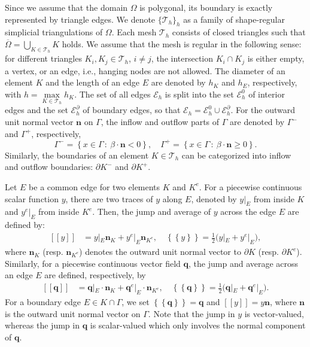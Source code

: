 \documentclass[a4paper,10pt]{article}
\newcommand{\set}[2]{\left\{{#1}\,:~{#2}\right\}}
\newcommand {\average}[1] {\mbox{$\left\{\!\!\left\{ #1 \right\}\!\!\right\}$}}
\newcommand {\jump}[1] {\mbox{$\left[\!\left[ #1 \right]\!\right]$}}
\newcommand{\cT}{{\mathcal{T}}}
\newcommand{\cE}{{\mathcal{E}}}
\newcommand{\bn}{{\mathbf{n}}}
\numberwithin{theorem}{section}
\begin{document}
Since we assume that the domain $\Omega$ is polygonal, its boundary is exactly represented by triangle edges. We denote $\{ \cT_h\}_h$ as a family of shape-regular simplicial triangulations of $\Omega$. Each mesh $\cT_h$ consists of closed triangles such that $\overline{\Omega} = \bigcup_{K \in \cT_h} K$ holds. We assume that the mesh is regular in the following sense: for different triangles
$K_i, K_j \in \cT_h$, $i \not= j$, the intersection  $K_i \cap K_j$ is either empty, a vertex, or an edge, i.e., hanging nodes are not allowed. The diameter of an element $K$ and the length of an edge $E$ are denoted by $h_{K}$ and $h_E$, respectively, with $h = \max \limits_{K \in \cT_h}  h_K$.
The  set of all edges $\cE_h$ is split into the set $\cE^0_h$ of interior edges and the set $\cE^{\partial}_h$ of boundary edges, so that $\cE_h=\cE^{0}_h  \cup \cE^{\partial}_h$. For the outward unit normal  vector  $\bn$ on $\Gamma$, the inflow and outflow parts of $\Gamma$ are denoted by $\Gamma^-$ and $\Gamma^+$, respectively,
\[
          \Gamma^- = \set{x \in \Gamma}{\beta\cdot \bn < 0}, \quad
          \Gamma^+ = \set{x \in \Gamma}{\beta \cdot \bn \geq 0}.
\]
Similarly, the boundaries of an element $K \in \cT_h$ can be categorized into inflow and outflow boundaries: $\partial K^-$ and $\partial K^+$. 

Let $E$ be a common edge for two elements $K$ and $K^e$. For a piecewise continuous scalar function $y$, there are two traces of $y$ along $E$, denoted by $y|_E$ from inside $K$ and $y^e|_E$ from inside $K^e$. Then, the jump and average of $y$ across the edge $E$ are defined by:
\begin{align*}
    \jump{y}&=y|_E\bn_{K}+y^e|_E\bn_{K^e}, \quad
    \average{y}=\frac{1}{2}\big( y|_E+y^e|_E \big),
\end{align*}
where $\bn_K$ (resp. $\bn_{K^e}$) denotes the outward unit  normal vector to $\partial K$ (resp. $\partial K^e$). Similarly, for a piecewise continuous vector field $\mathbf{q}$, the jump and average across an edge $E$ are defined, respectively, by
\begin{align*}
           \jump{\mathbf{q}}&=\mathbf{q}|_E \cdot \bn_{K} + \mathbf{q}^e|_E \cdot \bn_{K^e}, \quad
          \average{\mathbf{q}}=\frac{1}{2}\big(\mathbf{q}|_E+\mathbf{q}^e|_E \big).
\end{align*}
For a boundary edge $E \in K \cap \Gamma$, we set $\average{\mathbf{q}}=\mathbf{q}$ and $\jump{y}=y\bn$,
where $\bn$ is the outward unit normal  vector on $\Gamma$. Note that the jump in $y$ is vector-valued, whereas the jump in $\mathbf{q}$ is  scalar-valued which only involves the normal component of $\mathbf{q}$.
\end{document}
